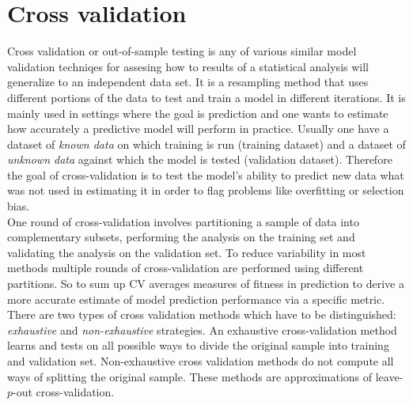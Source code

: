 \documentclass[12pt, a4paper]{article}
\begin{document}
\section{Cross validation}
\label{sec: cross_validation}
Cross validation or out-of-sample testing is any of various similar model validation techniqes for assesing how to results of a statistical analysis will generalize to an independent data set. It is a resampling method that uses different portions of the data to test and train a model in different iterations. It is mainly used in settings where the goal is prediction and one wants to estimate how accurately a predictive model will perform in practice. Usually one have a dataset of \textit{known data} on which training is run (training dataset) and a dataset of \textit{unknown data} against which the model is tested (validation dataset).
Therefore the goal of cross-validation is to test the model's ability to predict new data what was not used in estimating it in order to flag problems like overfitting or selection bias. \\
One round of cross-validation involves partitioning a sample of data into complementary subsets, performing the analysis on the training set and validating the analysis on the validation set.
To reduce variability in most methods multiple rounds of cross-validation are performed using different partitions. So to sum up CV averages measures of fitness in prediction to derive a more accurate estimate of model prediction performance via a specific metric. \\
There are two types of cross validation methods which have to be distinguished: \textit{exhaustive} and \textit{non-exhaustive} strategies. An exhaustive cross-validation method learns and tests on all possible ways to divide the original sample into training and validation set. Non-exhaustive cross validation methods do not compute all ways of splitting the original sample. These methods are approximations of leave-$p$-out cross-validation.
\end{document}

